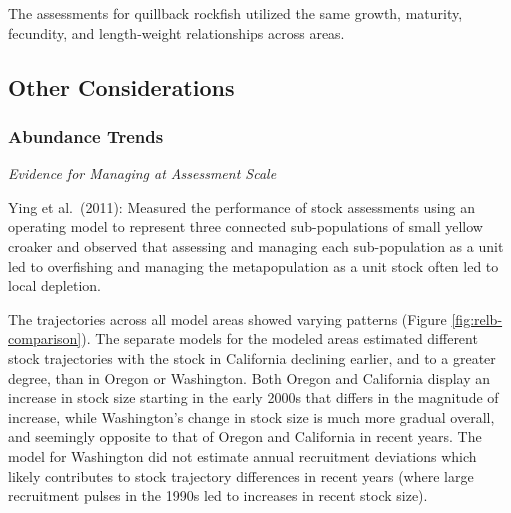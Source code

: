 \documentclass[11pt,
  english,
  letterpaper,
]{article}
\begin{document}
\leavevmode\tagmcend\tagstructend\par


The assessments for quillback rockfish utilized the same growth, maturity, fecundity, and length-weight relationships across areas.

\leavevmode\tagmcend\tagstructend\par


\hypertarget{other-considerations}{%
\subsection{Other Considerations}\label{other-considerations}}

\leavevmode\tagmcend\tagstructend


\hypertarget{abundance-trends}{%
\subsubsection{Abundance Trends}\label{abundance-trends}}

\leavevmode\tagmcend\tagstructend


\emph{Evidence for Managing at Assessment Scale}

\leavevmode\tagmcend\tagstructend\par


Ying et al.~{(2011)\leavevmode\tagmcend\tagstructend}: Measured the performance of stock assessments using an operating model to represent three connected sub-populations of small yellow croaker and observed that assessing and managing each sub-population as a unit led to overfishing and managing the metapopulation as a unit stock often led to local depletion.

\leavevmode\tagmcend\tagstructend\par


The trajectories across all model areas showed varying patterns (Figure \ref{fig:relb-comparison}). The separate models for the modeled areas estimated different stock trajectories with the stock in California declining earlier, and to a greater degree, than in Oregon or Washington. Both Oregon and California display an increase in stock size starting in the early 2000s that differs in the magnitude of increase, while Washington's change in stock size is much more gradual overall, and seemingly opposite to that of Oregon and California in recent years. The model for Washington did not estimate annual recruitment deviations which likely contributes to stock trajectory differences in recent years (where large recruitment pulses in the 1990s led to increases in recent stock size).
\end{document}
